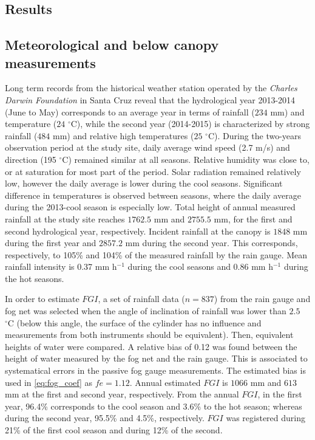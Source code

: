 \documentclass[a4paper,12pt]{article}
\begin{document}
\begin{linenumbers}
\section{Results}
\subsection{Meteorological and below canopy measurements}
Long term records from the historical weather station operated by the \emph{Charles Darwin Foundation} in Santa Cruz reveal that the hydrological year 2013-2014 (June to May) corresponds to an average year in terms of rainfall ($234$ $\mathrm{{mm}}$) and temperature ($24$ $\mathrm{^{\circ}C}$), while the second year (2014-2015) is characterized by strong rainfall ($484$ $\mathrm{{mm}}$) and relative high temperatures ($25$ $\mathrm{^{\circ}C}$). During the two-years observation period at the study site, daily average wind speed (2.7 m/s) and direction (195 $\mathrm{^{\circ}C}$) remained similar at all seasons. Relative humidity was close to, or at saturation for most part of the period. Solar radiation remained relatively low, however the daily average is lower during the cool seasons. Significant difference in temperatures is observed between seasons, where the daily average during the 2013-cool season is especially low. Total height of annual measured rainfall at the study site reaches $1762.5$ $\mathrm{{mm}}$ and $2755.5$ $\mathrm{{mm}}$, for the first and second hydrological year, respectively. Incident rainfall at the canopy is $1848$ $\mathrm{{mm}}$ during the first year and $2857.2$ $\mathrm{{mm}}$ during the second year. This corresponds, respectively, to 105\% and 104\% of the measured rainfall by the rain gauge. Mean rainfall intensity is 0.37 mm h$^{-1}$ during the cool seasons and 0.86 mm h$^{-1}$ during the hot seasons.

In order to estimate $FGI$, a set of rainfall data ($n=837$) from the rain gauge and fog net was selected when the angle of inclination of rainfall was lower than $2.5$ $\mathrm{^{\circ}C}$ (below this angle, the surface of the cylinder has no influence and measurements from both instruments should be equivalent). Then, equivalent heights of water were compared. A relative bias of 0.12 was found between the height of water measured by the fog net and the rain gauge. This is associated to systematical errors in the passive fog gauge measurements. The estimated bias is used in \autoref{eq:fog_coef} as $fe=1.12$. Annual estimated $FGI$ is $1066$ $\mathrm{{mm}}$ and $613$ $\mathrm{{mm}}$ at the first and second year, respectively. From the annual $FGI$, in the first year, 96.4\% corresponds to the cool season and 3.6\% to the hot season; whereas during the second year, 95.5\% and 4.5\%, respectively. $FGI$ was registered during 21\% of the first cool season and during 12\% of the second.
 

\end{linenumbers}
\end{document}
